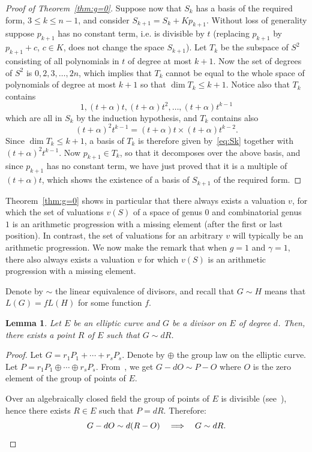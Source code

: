 \documentclass[10pt]{amsart}
\newtheorem{lemm}[theo]{Lemma}
\theoremstyle{definition}
\theoremstyle{remark}
\renewcommand{\leq}{\leqslant}
\newcommand*{\MK}{\mkern 2mu}
\begin{document}
\begin{proof}[Proof of Theorem~\ref{thm:g=0}]
Suppose now that $S_k$ has a basis of the required form, $3\leq k\leq n-1$, and consider $S_{k+1}=S_k+Kp_{k+1}$. Without loss of generality suppose $p_{k+1}$ has no constant term, i.e. is divisible by $t$ (replacing $p_{k+1}$ by $p_{k+1}+c$, $c\in K$, does not change the space $S_{k+1}$). Let $T_k$ be the subspace of $S^2$ consisting of all polynomials in $t$ of degree at most $k+1$. Now the set of degrees of $S^2$ is $0,2,3,\ldots,2n$, which implies that $T_k$ cannot be equal to the whole space of polynomials of degree at most $k+1$ so that $\dim T_k\leq k+1$. Notice also that $T_k$ contains
\begin{equation}\label{eq:Sk}
1,(t+\alpha)t,(t+\alpha)t^2,\ldots,(t+\alpha)t^{k-1}
\end{equation}
which are all in $S_k$ by the induction hypothesis, and $T_k$ contains also
\[
(t+\alpha)^2t^{k-1}=(t+\alpha)t \times (t+\alpha)t^{k-2}.
\]
Since $\dim T_k\leq k+1$, a basis of $T_k$ is therefore given by~\eqref{eq:Sk} together with $(t+\alpha)^2t^{k-1}$. Now $p_{k+1}\in T_k$, so that it decomposes over the above basis, and since $p_{k+1}$ has no constant term, we have just proved that it is a multiple of $(t+\alpha)t$, which shows the existence of a basis of $S_{k+1}$ of the required form.
\end{proof}

Theorem~\ref{thm:g=0} shows in particular that there always exists a valuation $v$, for which the set of valuations $v(S)$ of a space of genus $0$ and combinatorial genus $1$ is an arithmetic progression with a missing element (after the first or last position). In contrast, the set of valuations for an arbitrary $v$ will typically be an arithmetic progression. We now make the remark that when $g=1$ and $\gamma=1$, there also always exists a valuation $v$ for which $v(S)$ is an arithmetic progression with a missing element.

Denote by $\sim$ the linear equivalence of divisors, and recall that $G \sim H$ means that $L(G)= fL(H)$ for some function $f$.

\begin{lemm}\label{lem:one_point}
Let $E$ be an elliptic curve and $G$ be a divisor on $E$ of degree $d$. Then, there exists a point $R$ of $E$ such that $G \sim dR$.
\end{lemm}

\begin{proof}
Let $G= r_1 P_1 + \cdots + r_s P_s$. Denote by $\oplus$ the group law on the elliptic curve. Let $P= r_1P_1 \oplus \cdots \oplus r_s P_s$. From~\cite[Proposition~III.3.4]{Silverman}, we get $ G - dO \sim P-O $ where $O$ is the zero element of the group of points of $E$.

Over an algebraically closed field the group of points of $E$ is divisible (see~\cite[Theorem~4.10$\MK$(a)]{Silverman}), hence there exists $R \in E$ such that $P= dR$. Therefore:
\[
G-dO \sim d(R-O)\quad \Longrightarrow \quad G \sim dR.\qedhere
\]
\end{proof}
\end{document}
